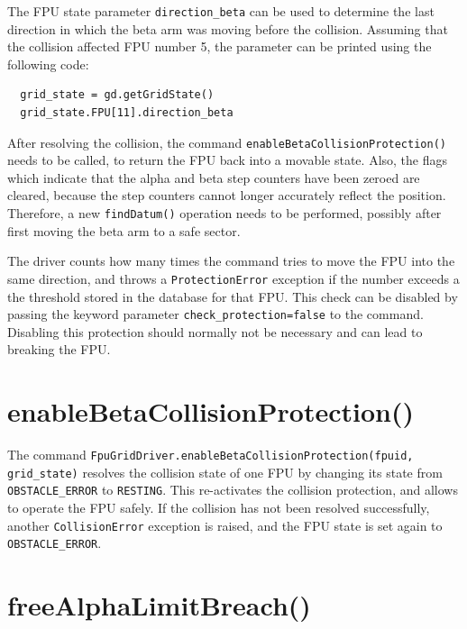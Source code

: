 \documentclass[fontsize=12,a4paper]{scrreprt}
\begin{document}
%
The FPU state parameter \texttt{direction\_beta} can be used to
determine the last direction in which the beta arm was moving before
the collision. Assuming that the collision affected FPU number 5,
the parameter can be printed using the following code:

\begin{verbatim}
  grid_state = gd.getGridState()
  grid_state.FPU[11].direction_beta
\end{verbatim}


After resolving the collision, the command
\texttt{enableBetaCollisionProtection()} needs to be called, to return
the FPU back into a movable state.  Also, the flags which indicate
that the alpha and beta step counters have been zeroed are cleared,
because the step counters cannot longer accurately reflect the
position. Therefore, a new \texttt{findDatum()} operation needs to be
performed, possibly after first moving the beta arm to a safe sector.

The driver counts how many times the command tries to move the FPU
into the same direction, and throws a \texttt{ProtectionError}
exception if the number exceeds a the threshold stored in the database
for that FPU. This check can be disabled by passing the keyword
parameter \texttt{check\_protection=false} to the command. Disabling
this protection should normally not be necessary and can lead to
breaking the FPU.


\section{enableBetaCollisionProtection()}

The command \texttt{FpuGridDriver.enableBetaCollisionProtection(fpuid,
  grid\_state)} resolves the collision state of one FPU by changing
its state from \texttt{OBSTACLE\_ERROR} to \texttt{RESTING}.  This
re-activates the collision protection, and allows to operate the FPU
safely. If the collision has not been resolved successfully, another
\texttt{CollisionError} exception is raised, and the FPU state is set
again to \texttt{OBSTACLE\_ERROR}.



\section{freeAlphaLimitBreach()}
\end{document}
